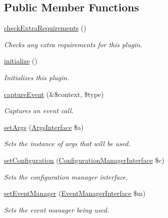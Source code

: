 \subsection*{Public Member Functions}
\begin{DoxyCompactItemize}
\item 
\hyperlink{classPermissionsPlugin_af3486b714be648b5713b64cf9f36c377}{check\-Extra\-Requirements} ()
\begin{DoxyCompactList}\small\item\em Checks any extra requirements for this plugin. \end{DoxyCompactList}\item 
\hyperlink{classPermissionsPlugin_ac1ee1f8d03f2b87380c67e64760eacf6}{initialize} ()
\begin{DoxyCompactList}\small\item\em Initializes this plugin. \end{DoxyCompactList}\item 
\hyperlink{classPermissionsPlugin_ab342dc10d6945e6957413b9d05f7dfd1}{capture\-Event} (\&\$context, \$type)
\begin{DoxyCompactList}\small\item\em Captures an event call. \end{DoxyCompactList}\item 
\hyperlink{classGenericPlugin_abf0b12b47909ef3c4dada146ea775526}{set\-Args} (\hyperlink{interfaceArgsInterface}{Args\-Interface} \$a)
\begin{DoxyCompactList}\small\item\em Sets the instance of args that will be used. \end{DoxyCompactList}\item 
\hyperlink{classGenericPlugin_a009c5398920a9672a2f13af38756fd5f}{set\-Configuration} (\hyperlink{interfaceConfigurationManagerInterface}{Configuration\-Manager\-Interface} \$c)
\begin{DoxyCompactList}\small\item\em Sets the configuration manager interface. \end{DoxyCompactList}\item 
\hyperlink{classGenericPlugin_afc683b68f471d89aa6a95daebcbfe28a}{set\-Event\-Manager} (\hyperlink{interfaceEventManagerInterface}{Event\-Manager\-Interface} \$m)
\begin{DoxyCompactList}\small\item\em Sets the event manager being used. \end{DoxyCompactList}\item 

\end{DoxyCompactItemize}
